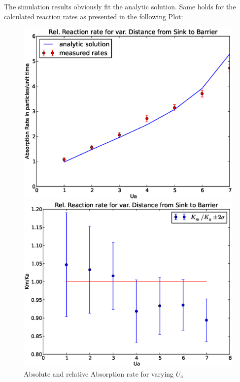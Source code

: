 The simulation results obviously fit the analytic solution. Same holds for the calculated reaction rates as presented in the following Plot:
\begin{figure}[H]
\centering
\begin{minipage}{.5 \textwidth}
    \centering
    \includegraphics[width=.95 \textwidth, keepaspectratio]{plots/cp/ua/Kabs.eps}
\end{minipage}\begin{minipage}{.5 \textwidth}
    \includegraphics[width=.95 \textwidth, keepaspectratio]{plots/cp/ua/Krel.eps}
\end{minipage}
\caption{Absolute and relative Absorption rate for varying $U_a$}
\label{fig:KUaCp}
\end{figure}

